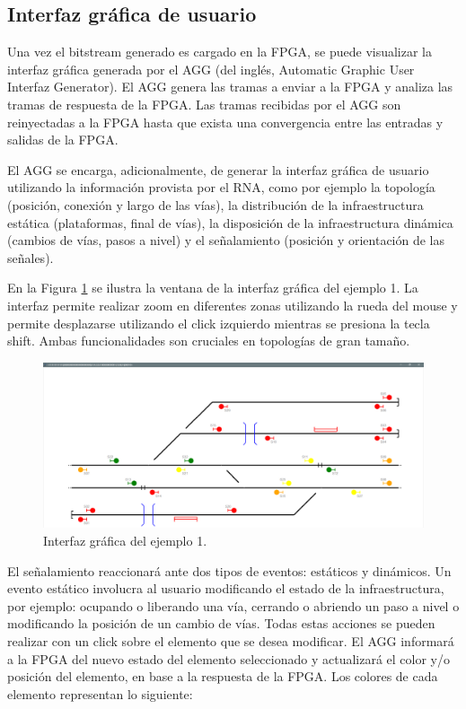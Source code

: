 \subsection{Interfaz gráfica de usuario}
	\label{sec:AGG_GUI}
		
	Una vez el bitstream generado es cargado en la FPGA, se puede visualizar la interfaz gráfica generada por el AGG (del inglés, Automatic Graphic User Interfaz Generator). El AGG genera las tramas a enviar a la FPGA y analiza las tramas de respuesta de la FPGA. Las tramas recibidas por el AGG son reinyectadas a la FPGA hasta que exista una convergencia entre las entradas y salidas de la FPGA.
	
	El AGG se encarga, adicionalmente, de generar la interfaz gráfica de usuario utilizando la información provista por el RNA, como por ejemplo la topología (posición, conexión y largo de las vías), la distribución de la infraestructura estática (plataformas, final de vías), la disposición de la infraestructura dinámica (cambios de vías, pasos a nivel) y el señalamiento (posición y orientación de las señales).
	
	En la Figura \ref{fig:EJ1_AGG} se ilustra la ventana de la interfaz gráfica del ejemplo 1. La interfaz permite realizar zoom en diferentes zonas utilizando la rueda del mouse y permite desplazarse utilizando el click izquierdo mientras se presiona la tecla shift. Ambas funcionalidades son cruciales en topologías de gran tamaño. 
	
	\begin{figure}[H]
		\centering
		\includegraphics[origin = c, width=1\textwidth]{resultados-obtenidos/ejemplo1/images/AGG_S32_YES}
		\centering\caption{Interfaz gráfica del ejemplo 1.}
		\label{fig:EJ1_AGG}
	\end{figure}
	
	El señalamiento reaccionará ante dos tipos de eventos: estáticos y dinámicos. Un evento estático involucra al usuario modificando el estado de la infraestructura, por ejemplo: ocupando o liberando una vía, cerrando o abriendo un paso a nivel o modificando la posición de un cambio de vías. Todas estas acciones se pueden realizar con un click sobre el elemento que se desea modificar. El AGG informará a la FPGA del nuevo estado del elemento seleccionado y actualizará el color y/o posición del elemento, en base a la respuesta de la FPGA. Los colores de cada elemento representan lo siguiente:
	
